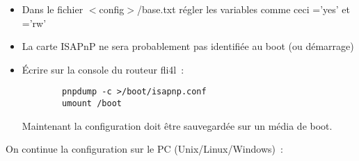   \begin{itemize}
  \item Dans le fichier $<$config$>$/base.txt régler les variables
    comme ceci ='yes' et ='rw'
  \item La carte ISAPnP ne sera probablement pas identifiée au boot (ou démarrage)
  \item Écrire sur la console du routeur fli4l~:
\begin{example}
\begin{verbatim}
        pnpdump -c >/boot/isapnp.conf
        umount /boot
\end{verbatim}
\end{example}
    Maintenant la configuration doit être sauvegardée sur un média de boot.
  \end{itemize}
  On continue la configuration sur le PC (Unix/Linux/Windows)~:
